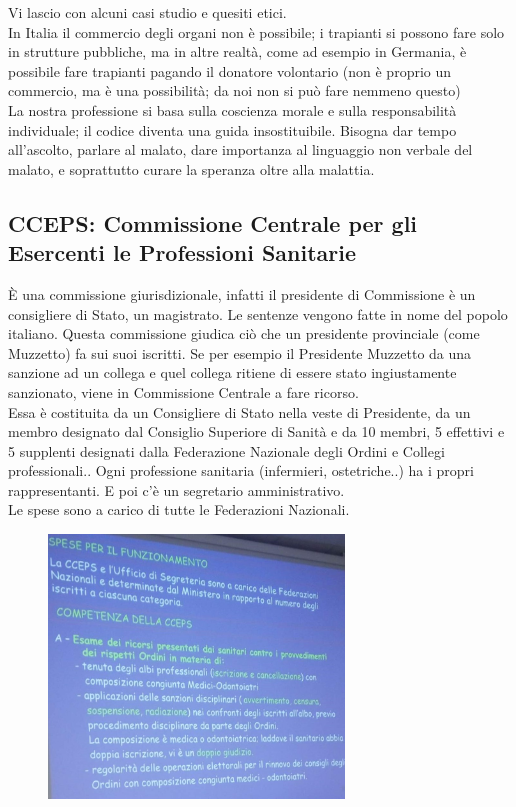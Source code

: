 Vi lascio con alcuni casi studio e quesiti etici.
\\
In Italia il commercio degli organi non è possibile; i trapianti si
possono fare solo in strutture pubbliche, ma in altre realtà, come ad
esempio in Germania, è possibile fare trapianti pagando il donatore
volontario (non è proprio un commercio, ma è una possibilità; da noi non
si può fare nemmeno questo)
\\
La nostra professione si basa sulla coscienza morale e sulla
responsabilità individuale; il codice diventa una guida insostituibile.
Bisogna dar tempo all'ascolto, parlare al malato, dare importanza al
linguaggio non verbale del malato, e soprattutto curare la speranza
oltre alla malattia.
\subsection{CCEPS: Commissione Centrale per gli Esercenti le Professioni Sanitarie}

È una commissione giurisdizionale, infatti il presidente di Commissione
è un consigliere di Stato, un magistrato. Le sentenze vengono fatte in
nome del popolo italiano. Questa commissione giudica ciò che un
presidente provinciale (come Muzzetto) fa sui suoi iscritti. Se per
esempio il Presidente Muzzetto da una sanzione ad un collega e quel
collega ritiene di essere stato ingiustamente sanzionato, viene in
Commissione Centrale a fare ricorso.
\\
Essa è costituita da un Consigliere di Stato nella veste di Presidente,
da un membro designato dal Consiglio Superiore di Sanità e da 10 membri,
5 effettivi e 5 supplenti designati dalla Federazione Nazionale degli
Ordini e Collegi professionali.. Ogni professione sanitaria (infermieri,
ostetriche..) ha i propri rappresentanti. E poi c'è un segretario
amministrativo.
\\
Le spese sono a carico di tutte le Federazioni Nazionali.
\begin{figure}[!ht]
\centering
	\includegraphics[width=0.7\textwidth]{34/image20.jpeg}
	\end{figure}

